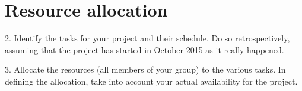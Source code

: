 \chapter{Resource allocation}\label{chap:allocation}

2. Identify the tasks for your project and their schedule. Do so retrospectively, assuming that the project has started in October 2015 as it really happened.

3. Allocate the resources (all members of your group) to the various tasks. In defining the allocation, take into account your actual availability for the project.


\lipsum[1-2]
